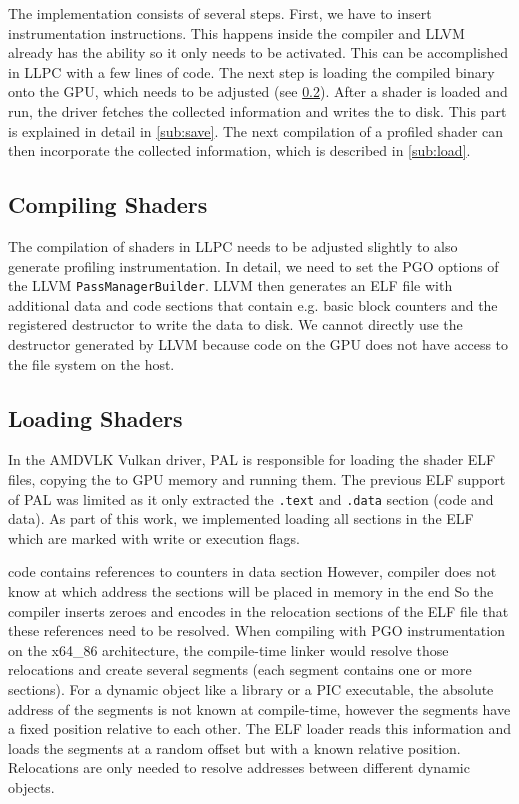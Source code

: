 \clearpage
{}
The implementation consists of several steps. First, we have to insert instrumentation instructions. This happens inside the compiler and LLVM already has the ability so it only needs to be activated. This can be accomplished in LLPC with a few lines of code. The next step is loading the compiled binary onto the GPU, which needs to be adjusted (see \cref{sub:loading}). After a shader is loaded and run, the driver fetches the collected information and writes the to disk. This part is explained in detail in \cref{sub:save}. The next compilation of a profiled shader can then incorporate the collected information, which is described in \cref{sub:load}.

\subsection{Compiling Shaders}
\label{sub:compiling}
The compilation of shaders in LLPC needs to be adjusted slightly to also generate profiling instrumentation. In detail, we need to set the PGO options of the LLVM \texttt{PassManagerBuilder}. LLVM then generates an ELF file with additional data and code sections that contain e.g. basic block counters and the registered destructor to write the data to disk. We cannot directly use the destructor generated by LLVM because code on the GPU does not have access to the file system on the host.

\subsection{Loading Shaders}
\label{sub:loading}
In the AMDVLK Vulkan driver, PAL is responsible for loading the shader ELF files, copying the to GPU memory and running them. The previous ELF support of PAL was limited as it only extracted the \texttt{.text} and \texttt{.data} section (code and data). As part of this work, we implemented loading all sections in the ELF which are marked with write or execution flags.

code contains references to counters in data section
However, compiler does not know at which address the sections will be placed in memory in the end
So the compiler inserts zeroes and encodes in the relocation sections of the ELF file that these references need to be resolved.
When compiling with PGO instrumentation on the x64\_86 architecture, the compile-time linker would resolve those relocations and create several segments (each segment contains one or more sections). For a dynamic object like a library or a PIC executable, the absolute address of the segments is not known at compile-time, however the segments have a fixed position relative to each other.
The ELF loader reads this information and loads the segments at a random offset but with a known relative position.
Relocations are only needed to resolve addresses between different dynamic objects.

